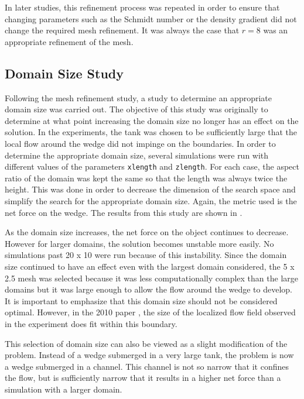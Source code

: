 \documentclass[12pt]{article}
\begin{document}
In later studies, this refinement process was repeated in order to ensure that changing parameters such as the Schmidt number or the density gradient did not change the required mesh refinement. It was always the case that $r=8$ was an appropriate refinement of the mesh.

\subsection{Domain Size Study}

Following the mesh refinement study, a study to determine an appropriate domain size was carried out. The objective of this study was originally to determine at what point increasing the domain size no longer has an effect on the solution. In the experiments, the tank was chosen to be sufficiently large that the local flow around the wedge did not impinge on the boundaries. In order to determine the appropriate domain size, several simulations were run with different values of the parameters \texttt{xlength} and \texttt{zlength}. For each case, the aspect ratio of the domain was kept the same so that the length was always twice the height. This was done in order to decrease the dimension of the search space and simplify the search for the appropriate domain size. Again, the metric used is the net force on the wedge. The results from this study are shown in .


As the domain size increases, the net force on the object continues to decrease. However for larger domains, the solution becomes unstable more easily. No simulations past 20 x 10 were run because of this instability. Since the domain size continued to have an effect even with the largest domain considered, the 5 x 2.5 mesh was selected because it was less computationally complex than the large domains but it was large enough to allow the flow around the wedge to develop. It is important to emphasize that this domain size should not be considered optimal. However, in the 2010 paper \cite{allshouse2010propulsion}, the size of the localized flow field observed in the experiment does fit within this boundary.

This selection of domain size can also be viewed as a slight modification of the problem. Instead of a wedge submerged in a very large tank, the problem is now a wedge submerged in a channel. This channel is not so narrow that it confines the flow, but is sufficiently narrow that it results in a higher net force than a simulation with a larger domain.
\end{document}
